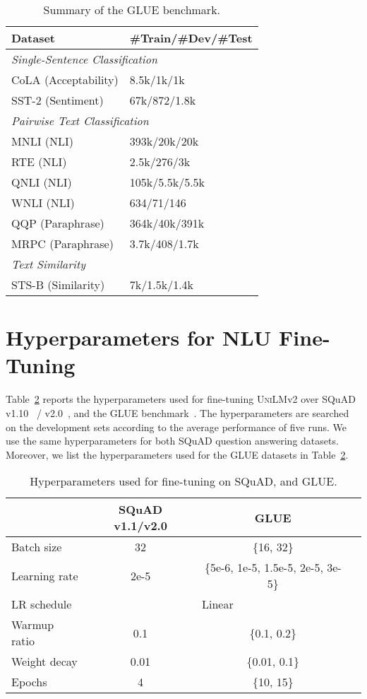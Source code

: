 \documentclass{article}
\newcommand{\vtwobase}{\textsc{UniLM}v2}
\begin{document}
\begin{table}[h]
\centering
\begin{tabular}{l l}
\toprule 
\textbf{Dataset} & \textbf{\#Train/\#Dev/\#Test}   \\ \midrule
\multicolumn{2}{l}{\emph{Single-Sentence Classification}} \\
CoLA (Acceptability)&8.5k/1k/1k \\
SST-2 (Sentiment)&67k/872/1.8k \\ \midrule
\multicolumn{2}{l}{\emph{Pairwise Text Classification}} \\
MNLI (NLI)& 393k/20k/20k\\
RTE (NLI) &2.5k/276/3k \\ 
QNLI (NLI)& 105k/5.5k/5.5k\\
WNLI (NLI) &634/71/146\\ 
QQP (Paraphrase)&364k/40k/391k\\ 
MRPC (Paraphrase) &3.7k/408/1.7k\\ \midrule
\multicolumn{2}{l}{\emph{Text Similarity}} \\
STS-B (Similarity) &7k/1.5k/1.4k \\ \bottomrule
\end{tabular}
\caption{Summary of the GLUE benchmark.
}
\label{tbl:glue:datasets}
\end{table}


\section{Hyperparameters for NLU Fine-Tuning}

Table~\ref{tbl:nlu_finetune_hyperparams} reports the hyperparameters used for fine-tuning \vtwobase{} over SQuAD v1.10~\cite{squad1} / v2.0~\cite{squad2}, and the GLUE benchmark~\cite{wang2018glue}.
The hyperparameters are searched on the development sets according to the average performance of five runs.
We use the same hyperparameters for both SQuAD question answering datasets.
Moreover, we list the hyperparameters used for the GLUE datasets in Table~\ref{tbl:nlu_finetune_hyperparams}.


\begin{table}[h]
\centering
\small
\begin{tabular}{@{\hskip3pt}l@{\hskip2pt}c@{\hskip2pt}c@{\hskip2pt}c@{\hskip4pt}}
\toprule
 & \bf SQuAD v1.1/v2.0 & \bf GLUE \\
\midrule
Batch size & 32  & \{16, 32\}\\
Learning rate & 2e-5 & \{5e-6, 1e-5, 1.5e-5, 2e-5, 3e-5\}\\
LR schedule & \multicolumn{2}{c}{Linear} \\
Warmup ratio & 0.1 & \{0.1, 0.2\} \\
Weight decay & 0.01 & \{0.01, 0.1\} \\
Epochs & 4 & \{10, 15\} \\
\bottomrule
\end{tabular}
\caption{
Hyperparameters used for fine-tuning on SQuAD, and GLUE.
}
\label{tbl:nlu_finetune_hyperparams}
\end{table}
\end{document}
